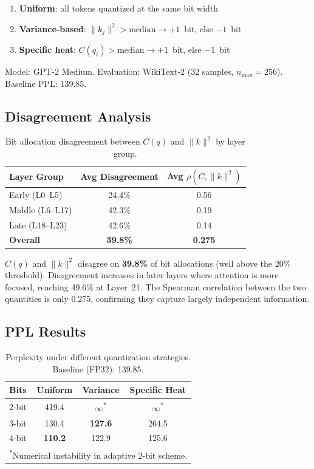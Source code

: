 \documentclass[11pt,a4paper]{article}
\begin{document}
\begin{enumerate}[nosep]
  \item \textbf{Uniform}: all tokens quantized at the same bit width
  \item \textbf{Variance-based}: $\|k_j\|^2 > \text{median} \to +1$~bit, else $-1$~bit
  \item \textbf{Specific heat}: $C(q_i) > \text{median} \to +1$~bit, else $-1$~bit
\end{enumerate}

Model: GPT-2 Medium. Evaluation: WikiText-2 (32 samples, $n_\mathrm{max}=256$). Baseline PPL: 139.85.

\subsection{Disagreement Analysis}

\begin{table}[H]
\centering
\caption{Bit allocation disagreement between $C(q)$ and $\|k\|^2$ by layer group.}
\label{tab:disagree}
\begin{tabular}{lcc}
\toprule
\textbf{Layer Group} & \textbf{Avg Disagreement} & \textbf{Avg $\rho(C, \|k\|^2)$} \\
\midrule
Early (L0--L5) & 24.4\% & 0.56 \\
Middle (L6--L17) & 42.3\% & 0.19 \\
Late (L18--L23) & 42.6\% & 0.14 \\
\midrule
\textbf{Overall} & \textbf{39.8\%} & \textbf{0.275} \\
\bottomrule
\end{tabular}
\end{table}

$C(q)$ and $\|k\|^2$ disagree on \textbf{39.8\%} of bit allocations (well above the 20\% threshold).
Disagreement increases in later layers where attention is more focused, reaching 49.6\% at Layer~21.
The Spearman correlation between the two quantities is only 0.275, confirming they capture largely independent information.

\subsection{PPL Results}

\begin{table}[H]
\centering
\caption{Perplexity under different quantization strategies. Baseline (FP32): 139.85.}
\label{tab:ppl}
\begin{tabular}{lccc}
\toprule
\textbf{Bits} & \textbf{Uniform} & \textbf{Variance} & \textbf{Specific Heat} \\
\midrule
2-bit & 419.4 & $\infty$\textsuperscript{*} & $\infty$\textsuperscript{*} \\
3-bit & 130.4 & \textbf{127.6} & 264.5 \\
4-bit & \textbf{110.2} & 122.9 & 125.6 \\
\bottomrule
\multicolumn{4}{l}{\footnotesize \textsuperscript{*}Numerical instability in adaptive 2-bit scheme.}
\end{tabular}
\end{table}
\end{document}
